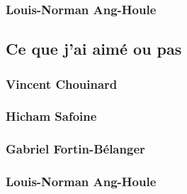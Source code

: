\documentclass[10pt,a4paper,final]{article}
\begin{document}
\begin{spacing}{1.5}
\subsubsection{Louis-Norman Ang-Houle}


\subsection{Ce que j'ai aimé ou pas}
\subsubsection{Vincent Chouinard}

\subsubsection{Hicham Safoine}

\subsubsection{Gabriel Fortin-Bélanger}

\subsubsection{Louis-Norman Ang-Houle}
\end{spacing}
\end{document}
